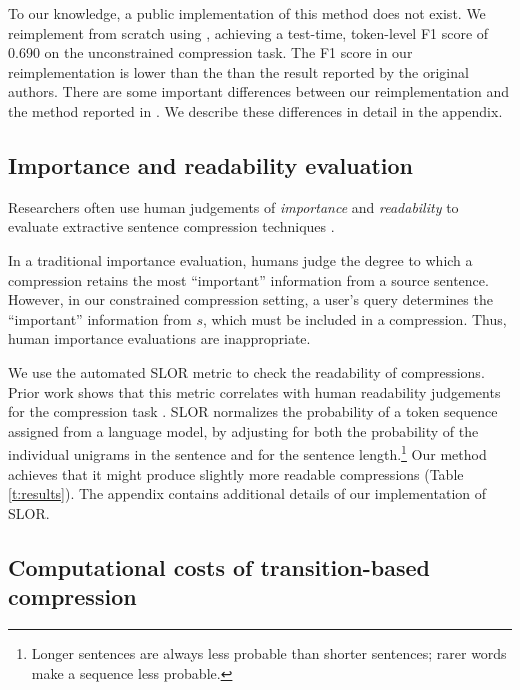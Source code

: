 \documentclass[11pt,a4paper]{article}
\begin{document}
To our knowledge, a public implementation of this method does not exist. We reimplement from scratch using \citet{gurobi}, achieving a test-time, token-level F1 score of  0.690 on the unconstrained compression task. The F1 score in our reimplementation is lower than the than the result reported by the original authors. There are some important differences between our reimplementation and the method reported in \citet{filippova2013overcoming}. We describe these differences in detail in the appendix.

\subsection{Importance and readability evaluation}\label{s:readabilityinformativeness}

Researchers often use human judgements of \textit{importance} and \textit{readability} to evaluate extractive sentence compression techniques \cite{Knight2000StatisticsBasedS,clarke2008global,filippova2015sentence}. 

In a traditional importance evaluation, humans judge the degree to which a compression retains the most ``important'' information from a source sentence. However, in our constrained compression setting, a user's query determines the ``important'' information from $s$, which must be included in a compression. Thus, human importance evaluations are inappropriate.
 
We use the automated SLOR metric \cite{lau2015unsupervised} to check the readability of compressions. Prior work shows that this metric correlates with human readability judgements for the compression task \cite{kannConl}. SLOR normalizes the probability of a token sequence assigned from a language model, by adjusting for both the probability of the individual unigrams in the sentence and for the sentence length.\footnote{Longer sentences are always less probable than shorter sentences; rarer words make a sequence less probable.} Our method achieves that it might produce slightly more readable compressions (Table \ref{t:results}). The appendix contains additional details of our implementation of SLOR. 

\subsection{Computational costs of transition-based compression}\label{s:costs}
\end{document}
